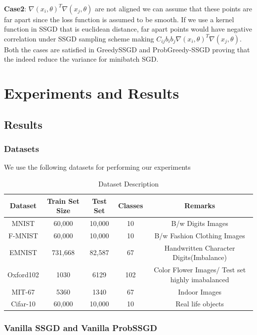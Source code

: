 \documentclass[a4paper,twoside]{iiththesis}
\theoremstyle{definition}
\theoremstyle{definition}
\theoremstyle{remark}
\begin{document}
\\
\textbf{Case2}:  $\nabla(x_i, \theta)^T \nabla(x_j, \theta)$ are not aligned  we can assume that these points are far apart since the loss function is assumed to be smooth. If we use a kernel function in SSGD that is euclidean distance, far apart points would have negative correlation under SSGD sampling scheme making $C_{ij} b_i b_j \nabla(x_i, \theta)^T \nabla(x_j, \theta).$\\
Both the cases are satisfied in GreedySSGD and ProbGreedy-SSGD proving that the indeed reduce the variance for minibatch SGD.


\part{Experiments and Results}

\chapter{Results }

\section{Datasets}
We use the following datasets for performing our experiments
\begin{table}[!htb]\label{Dataset}
	\renewcommand{\arraystretch}{1.5}
	\centering
	\begin{tabular}{|c|c|c|c|c|} \hline
		\textbf{Dataset} & \textbf{Train Set Size} & \textbf{Test Set} & \textbf{Classes} & \textbf{Remarks}\\ \hline
		MNIST & 60,000  &  10,000 & 10 & B/w Digits Images\\ \hline
		F-MNIST & 60,000  &  10,000 & 10& B/w Fashion Clothing Images \\ \hline
		EMNIST & 731,668  &  82,587 & 67 & Handwritten Character Digits(Imbalance)\\ \hline
		Oxford102 & 1030 &  6129 & 102 & Color Flower Images/ Test set highly imabalanced\\ \hline
		MIT-67 & 5360 & 1340 & 67 & Indoor Images\\ \hline
		Cifar-10 & 60,000 & 10,000 & 10& Real life objects\\ \hline
	\end{tabular}
    \caption{Dataset Description}
\end{table}

\section{Vanilla SSGD and Vanilla ProbSSGD}
\end{document}
